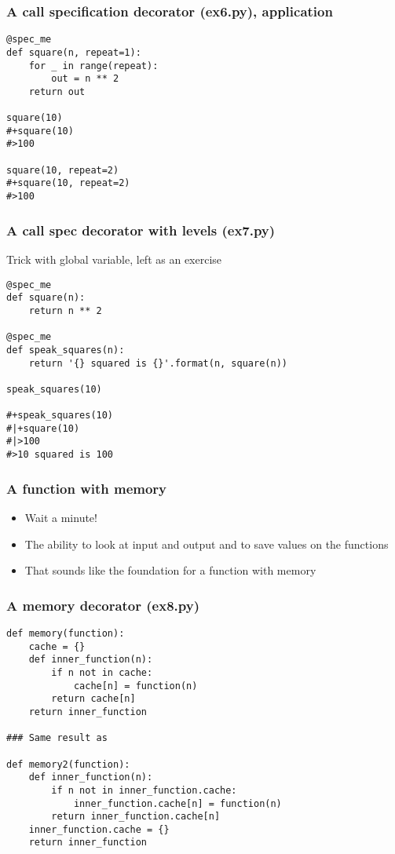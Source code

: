 \documentclass{beamer}
\begin{document}
\begin{frame}[fragile]
  \frametitle{A call specification decorator (ex6.py), application}
\begin{verbatim}
@spec_me
def square(n, repeat=1):
    for _ in range(repeat):
        out = n ** 2
    return out

square(10)
#+square(10)
#>100

square(10, repeat=2)
#+square(10, repeat=2)
#>100
\end{verbatim}
\end{frame}

\begin{frame}[fragile]
  \frametitle{A call spec decorator with levels (ex7.py)}
  \begin{exampleblock}{\vspace*{-3ex}}
    Trick with global variable, left as an exercise
  \end{exampleblock}
\begin{verbatim}
@spec_me
def square(n):
    return n ** 2

@spec_me
def speak_squares(n):
    return '{} squared is {}'.format(n, square(n))

speak_squares(10)

#+speak_squares(10)
#|+square(10)
#|>100
#>10 squared is 100
\end{verbatim}
\end{frame}

\begin{frame}
  \frametitle{A function with memory}
  \begin{itemize}
  \item Wait a minute!
  \item The ability to look at input and output and to save values on the
    functions
  \item That sounds like the foundation for a function with memory
  \end{itemize}
\end{frame}

\begin{frame}[fragile]
  \frametitle{A memory decorator (ex8.py)}
\begin{verbatim}
def memory(function):
    cache = {}
    def inner_function(n):
        if n not in cache:
            cache[n] = function(n)
        return cache[n]
    return inner_function

### Same result as

def memory2(function):
    def inner_function(n):
        if n not in inner_function.cache:
            inner_function.cache[n] = function(n)
        return inner_function.cache[n]
    inner_function.cache = {}
    return inner_function
\end{verbatim}
\end{frame}
\end{document}
